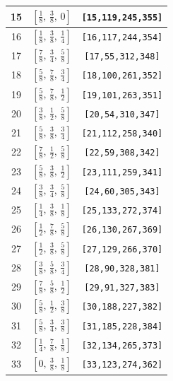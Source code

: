\documentclass[fleqn,8pt]{jsarticle}
\begin{document}
\begin{longtable}{ccc}
15 & $\left[ \frac{1}{8},\, \frac{3}{8},\, 0 \right]$ & {\tt [15,119,245,355]} \\ \hline
16 & $\left[ \frac{1}{8},\, \frac{3}{8},\, \frac{1}{4} \right]$ & {\tt [16,117,244,354]} \\ \hline
17 & $\left[ \frac{7}{8},\, \frac{3}{4},\, \frac{5}{8} \right]$ & {\tt [17,55,312,348]} \\ \hline
18 & $\left[ \frac{5}{8},\, \frac{7}{8},\, \frac{3}{4} \right]$ & {\tt [18,100,261,352]} \\ \hline
19 & $\left[ \frac{5}{8},\, \frac{7}{8},\, \frac{1}{2} \right]$ & {\tt [19,101,263,351]} \\ \hline
20 & $\left[ \frac{3}{8},\, \frac{1}{2},\, \frac{5}{8} \right]$ & {\tt [20,54,310,347]} \\ \hline
21 & $\left[ \frac{5}{8},\, \frac{3}{8},\, \frac{3}{4} \right]$ & {\tt [21,112,258,340]} \\ \hline
22 & $\left[ \frac{7}{8},\, \frac{1}{2},\, \frac{5}{8} \right]$ & {\tt [22,59,308,342]} \\ \hline
23 & $\left[ \frac{5}{8},\, \frac{3}{8},\, \frac{1}{2} \right]$ & {\tt [23,111,259,341]} \\ \hline
24 & $\left[ \frac{3}{8},\, \frac{3}{4},\, \frac{5}{8} \right]$ & {\tt [24,60,305,343]} \\ \hline
25 & $\left[ \frac{1}{4},\, \frac{3}{8},\, \frac{1}{8} \right]$ & {\tt [25,133,272,374]} \\ \hline
26 & $\left[ \frac{1}{2},\, \frac{7}{8},\, \frac{5}{8} \right]$ & {\tt [26,130,267,369]} \\ \hline
27 & $\left[ \frac{1}{2},\, \frac{3}{8},\, \frac{5}{8} \right]$ & {\tt [27,129,266,370]} \\ \hline
28 & $\left[ \frac{3}{8},\, \frac{5}{8},\, \frac{3}{4} \right]$ & {\tt [28,90,328,381]} \\ \hline
29 & $\left[ \frac{7}{8},\, \frac{5}{8},\, \frac{1}{2} \right]$ & {\tt [29,91,327,383]} \\ \hline
30 & $\left[ \frac{5}{8},\, \frac{1}{2},\, \frac{3}{8} \right]$ & {\tt [30,188,227,382]} \\ \hline
31 & $\left[ \frac{5}{8},\, \frac{3}{4},\, \frac{3}{8} \right]$ & {\tt [31,185,228,384]} \\ \hline
32 & $\left[ \frac{1}{4},\, \frac{7}{8},\, \frac{1}{8} \right]$ & {\tt [32,134,265,373]} \\ \hline
33 & $\left[ 0,\, \frac{3}{8},\, \frac{1}{8} \right]$ & {\tt [33,123,274,362]} \\ \hline

\end{longtable}
\end{document}
